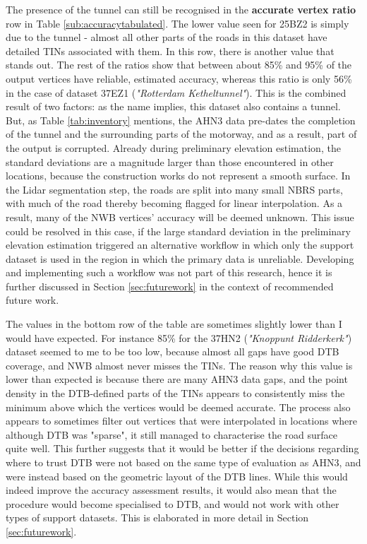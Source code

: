 The presence of the tunnel can still be recognised in the \textbf{accurate vertex ratio} row in Table \ref{sub:accuracytabulated}. The lower value seen for 25BZ2 is simply due to the tunnel - almost all other parts of the roads in this dataset have detailed TINs associated with them. In this row, there is another value that stands out. The rest of the ratios show that between about 85\% and 95\% of the output vertices have reliable, estimated accuracy, whereas this ratio is only 56\% in the case of dataset 37EZ1 (\textit{"Rotterdam Ketheltunnel"}). This is the combined result of two factors: as the name implies, this dataset also contains a tunnel. But, as Table \ref{tab:inventory} mentions, the AHN3 data pre-dates the completion of the tunnel and the surrounding parts of the motorway, and as a result, part of the output is corrupted. Already during preliminary elevation estimation, the standard deviations are a magnitude larger than those encountered in other locations, because the construction works do not represent a smooth surface. In the Lidar segmentation step, the roads are split into many small NBRS parts, with much of the road thereby becoming flagged for linear interpolation. As a result, many of the NWB vertices' accuracy will be deemed unknown. This issue could be resolved in this case, if the large standard deviation in the preliminary elevation estimation triggered an alternative workflow in which only the support dataset is used in the region in which the primary data is unreliable. Developing and implementing such a workflow was not part of this research, hence it is further discussed in Section \ref{sec:futurework} in the context of recommended future work.

The values in the bottom row of the table are sometimes slightly lower than I would have expected. For instance 85\% for the 37HN2 (\textit{"Knoppunt Ridderkerk"}) dataset seemed to me to be too low, because almost all gaps have good DTB coverage, and NWB almost never misses the TINs. The reason why this value is lower than expected is because there are many AHN3 data gaps, and the point density in the DTB-defined parts of the TINs appears to consistently miss the minimum above which the vertices would be deemed accurate. The process also appears to sometimes filter out vertices that were interpolated in locations where although DTB was "sparse", it still managed to characterise the road surface quite well. This further suggests that it would be better if the decisions regarding where to trust DTB were not based on the same type of evaluation as AHN3, and were instead based on the geometric layout of the DTB lines. While this would indeed improve the accuracy assessment results, it would also mean that the procedure would become specialised to DTB, and would not work with other types of support datasets. This is elaborated in more detail in Section \ref{sec:futurework}.

